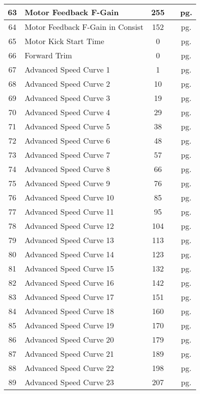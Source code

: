 \documentclass[12pt,letterpaper,draft]{memoir} %
\begin{document}
\begin{center}
\begin{longtable}{|c|l|c|c|c|}
63&Motor Feedback F-Gain&255&&pg. \pageref{CV63} \\ \hline
64&Motor Feedback F-Gain in Consist&152&&pg. \pageref{CV64} \\ \hline
65&Motor Kick Start Time&0&&pg. \pageref{CV65} \\ \hline
66&Forward Trim&0&&pg. \pageref{CV66} \\ \hline
67&Advanced Speed Curve 1&1&&pg. \pageref{CV67} \\ \hline
68&Advanced Speed Curve 2&10&&pg. \pageref{CV68} \\ \hline
69&Advanced Speed Curve 3&19&&pg. \pageref{CV69} \\ \hline
70&Advanced Speed Curve 4&29&&pg. \pageref{CV70} \\ \hline
71&Advanced Speed Curve 5&38&&pg. \pageref{CV71} \\ \hline
72&Advanced Speed Curve 6&48&&pg. \pageref{CV72} \\ \hline
73&Advanced Speed Curve 7&57&&pg. \pageref{CV73} \\ \hline
74&Advanced Speed Curve 8&66&&pg. \pageref{CV74} \\ \hline
75&Advanced Speed Curve 9&76&&pg. \pageref{CV75} \\ \hline
76&Advanced Speed Curve 10&85&&pg. \pageref{CV76} \\ \hline
77&Advanced Speed Curve 11&95&&pg. \pageref{CV77} \\ \hline
78&Advanced Speed Curve 12&104&&pg. \pageref{CV78} \\ \hline
79&Advanced Speed Curve 13&113&&pg. \pageref{CV79} \\ \hline
80&Advanced Speed Curve 14&123&&pg. \pageref{CV80} \\ \hline
81&Advanced Speed Curve 15&132&&pg. \pageref{CV81} \\ \hline
82&Advanced Speed Curve 16&142&&pg. \pageref{CV82} \\ \hline
83&Advanced Speed Curve 17&151&&pg. \pageref{CV83} \\ \hline
84&Advanced Speed Curve 18&160&&pg. \pageref{CV84} \\ \hline
85&Advanced Speed Curve 19&170&&pg. \pageref{CV85} \\ \hline
86&Advanced Speed Curve 20&179&&pg. \pageref{CV86} \\ \hline
87&Advanced Speed Curve 21&189&&pg. \pageref{CV87} \\ \hline
88&Advanced Speed Curve 22&198&&pg. \pageref{CV88} \\ \hline
89&Advanced Speed Curve 23&207&&pg. \pageref{CV89} \\ \hline

\end{longtable}
\end{center}
\end{document}
